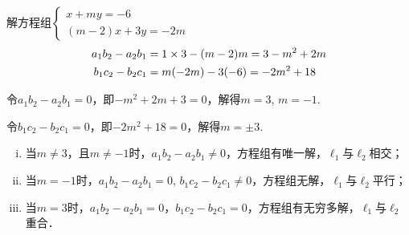 \begin{solution}
解方程组$\begin{cases}
    x+my=-6\\ (m-2)x+3y=-2m
\end{cases}$
\[\begin{split}
  a_1b_2-a_2b_1&=1\times3-(m-2)m=3-m^2+2m\\
b_1c_2-b_2c_1&=m(-2m)-3(-6)=-2m^2+18  
\end{split}\]

令$a_1b_2-a_2b_1=0$，即$-m^2+2m+3=0$，解得$m=3$, $m=-1$.

令$b_1c_2-b_2c_1=0$，即$-2m^2+18=0$，解得$m=\pm 3$.

\begin{enumerate}[(i)]
\item 当$m\ne 3$，且$m\ne -1$时，$a_1b_2-a_2b_1\ne 0$，方程组有唯一解，$\ell_1$与$\ell_2$相交；
\item 当$m=-1$时，$a_1b_2-a_2b_1=0$, $b_1c_2-b_2c_1\ne 0$，方程组无解，$\ell_1$与$\ell_2$平行；
\item 当$m=3$时，$a_1b_2-a_2b_1=0$，$b_1c_2-b_2c_1=0$，方程组有无穷多解，$\ell_1$与$\ell_2$重合． 
\end{enumerate}
\end{solution}

